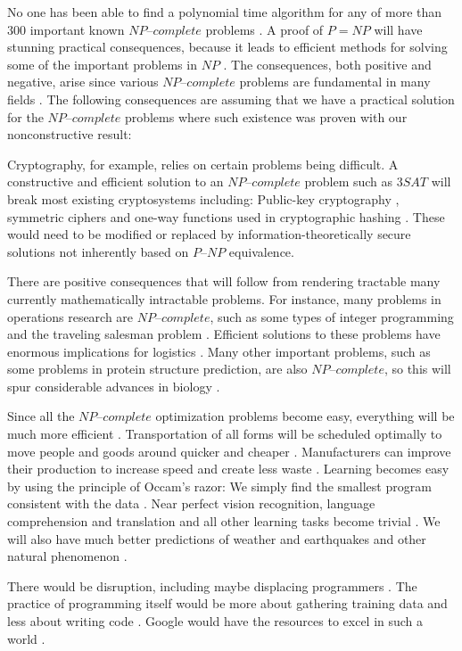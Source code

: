 \documentclass[a4paper,UKenglish,cleveref, autoref]{lipics-v2019}
\begin{document}
No one has been able to find a polynomial time algorithm for any of more than $300$ important known $\textit{NP--complete}$ problems \cite{GJ79}. A proof of $P = NP$ will have stunning practical consequences, because it leads to efficient methods for solving some of the important problems in $NP$ \cite{CS00}. The consequences, both positive and negative, arise since various $\textit{NP--complete}$ problems are fundamental in many fields \cite{CS00}. The following consequences are assuming that we have a practical solution for the $\textit{NP--complete}$ problems where such existence was proven with our nonconstructive result:

Cryptography, for example, relies on certain problems being difficult. A constructive and efficient solution to an $\textit{NP--complete}$ problem such as $3SAT$ will break most existing cryptosystems including: Public-key cryptography \cite{HW97}, symmetric ciphers \cite{MM00} and one-way functions used in cryptographic hashing \cite{DKV07}. These would need to be modified or replaced by information-theoretically secure solutions not inherently based on $\textit{P--NP}$ equivalence.

There are positive consequences that will follow from rendering tractable many currently mathematically intractable problems. For instance, many problems in operations research are $\textit{NP--complete}$, such as some types of integer programming and the traveling salesman problem \cite{GJ79}. Efficient solutions to these problems have enormous implications for logistics \cite{CS00}. Many other important problems, such as some problems in protein structure prediction, are also $\textit{NP--complete}$, so this will spur considerable advances in biology \cite{BL98}.

Since all the $\textit{NP--complete}$ optimization problems become easy, everything will be much more efficient \cite{LF09}. Transportation of all forms will be scheduled optimally to move people and goods around quicker and cheaper \cite{LF09}. Manufacturers can improve their production to increase speed and create less waste \cite{LF09}. Learning becomes easy by using the principle of Occam's razor: We simply find the smallest program consistent with the data \cite{LF09}. Near perfect vision recognition, language comprehension and translation and all other learning tasks become trivial \cite{LF09}. We will also have much better predictions of weather and earthquakes and other natural phenomenon \cite{LF09}.

There would be disruption, including maybe displacing programmers \cite{IMP95}. The practice of programming itself would be more about gathering training data and less about writing code \cite{IMP95}. Google would have the resources to excel in such a world \cite{IMP95}.
\end{document}
